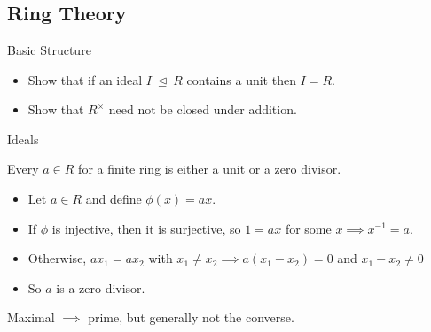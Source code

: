 \hypertarget{section}{%
\section{}\label{section}}

\hypertarget{ring-theory-1}{%
\subsection{Ring Theory}\label{ring-theory-1}}

Basic Structure

\begin{itemize}
\tightlist
\item
  Show that if an ideal \(I{~\trianglelefteq~}R\) contains a unit then
  \(I = R\).
\item
  Show that \(R^{\times}\) need not be closed under addition.
\end{itemize}

Ideals

\begin{problem}

Every \(a\in R\) for a finite ring is either a unit or a zero divisor.

\end{problem}

\begin{solution}

\hfill

\begin{itemize}
\tightlist
\item
  Let \(a\in R\) and define \(\phi(x) = ax\).
\item
  If \(\phi\) is injective, then it is surjective, so \(1 = ax\) for
  some \(x \implies x^{-1}= a\).
\item
  Otherwise, \(ax_1 = ax_2\) with
  \(x_1 \neq x_2 \implies a(x_1 - x_2) = 0\) and \(x_1 - x_2 \neq 0\)
\item
  So \(a\) is a zero divisor.
\end{itemize}

\end{solution}

\begin{problem}

Maximal \(\implies\) prime, but generally not the converse.

\end{problem}

